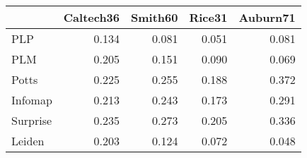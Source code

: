 \begin{tabular}{lrrrr}
\toprule
{} & Caltech36 & Smith60 & Rice31 & Auburn71 \\
\midrule
PLP      &     0.134 &   0.081 &  0.051 &    0.081 \\
PLM      &     0.205 &   0.151 &  0.090 &    0.069 \\
Potts    &     0.225 &   0.255 &  0.188 &    0.372 \\
Infomap  &     0.213 &   0.243 &  0.173 &    0.291 \\
Surprise &     0.235 &   0.273 &  0.205 &    0.336 \\
Leiden   &     0.203 &   0.124 &  0.072 &    0.048 \\
\bottomrule
\end{tabular}
